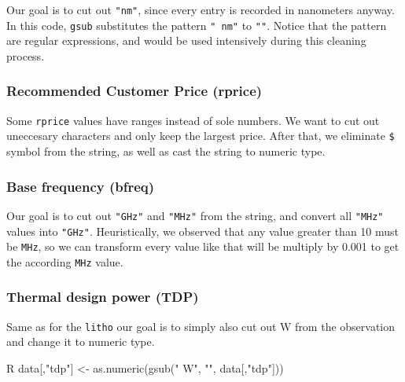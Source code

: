 Our goal is to cut out \verb|"nm"|, since every entry is recorded in nanometers anyway. In this code, \verb|gsub| substitutes 
the pattern \verb|" nm"| to \verb|""|. Notice that the pattern are regular expressions, and would be used intensively during 
this cleaning process.
\subsubsection*{Recommended Customer Price (rprice)}


Some \verb|rprice| values have ranges instead of sole numbers. We want to cut out uneccesary characters and only keep the largest price.
After that, we eliminate \verb|$| symbol from the string, as well as cast the string to numeric type.

\subsubsection*{Base frequency (bfreq)}


Our goal is to cut out \verb|"GHz"| and \verb|"MHz"| from the string, and convert all \verb|"MHz"| values into \verb|"GHz"|. Heuristically,
we observed that any value greater than 10 must be \verb|MHz|, so we can transform every value like that will be multiply by 0.001 to get 
the according \verb|MHz| value.

\subsubsection*{Thermal design power (TDP)}
Same as for the \verb|litho| our goal is to simply also cut out W from the observation and change it to numeric type.

\begin{code}{R}
data[,"tdp"] <- as.numeric(gsub(" W", "", data[,"tdp"]))    
\end{code}

